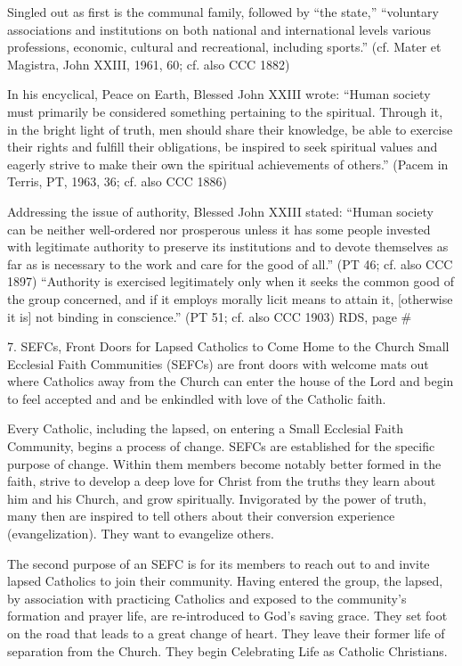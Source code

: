 \documentclass[oneside]{book}
\begin{document}
Singled out as first is the communal family, followed by ``the state,''
``voluntary associations and institutions  on both national and international
levels  various professions, economic, cultural and recreational, including
sports.'' (cf. Mater et Magistra, John XXIII, 1961, 60; cf. also CCC 1882)

In his encyclical, Peace on Earth, Blessed John XXIII wrote: ``Human society
must primarily be considered something pertaining to the spiritual. Through it,
in the bright light of truth, men should share their knowledge, be able to
exercise their rights and fulfill their obligations, be inspired to seek
spiritual values  and eagerly strive to make their own the spiritual
achievements of others.'' (Pacem in Terris, PT, 1963, 36; cf. also CCC 1886)

Addressing the issue of authority, Blessed John XXIII stated: ``Human society
can be neither well-ordered nor prosperous unless it has some people invested
with legitimate authority to preserve its institutions and to devote themselves
as far as is necessary to the work and care for the good of all.'' (PT 46;
cf. also CCC 1897) ``Authority is exercised legitimately only when it seeks the
common good of the group concerned, and if it employs morally licit means to
attain it, [otherwise it is] not binding in conscience.'' (PT 51; cf. also CCC
1903)
RDS, page \#

7. SEFCs, Front Doors for Lapsed Catholics to Come Home to the Church
Small Ecclesial Faith Communities (SEFCs) are front doors with welcome mats out
where Catholics away from the Church can enter the house of the Lord and begin
to feel accepted and and be enkindled with love of the Catholic faith.

Every Catholic, including the lapsed, on entering a Small Ecclesial Faith
Community, begins a process of change. SEFCs are established for the specific
purpose of change. Within them members become notably better formed in the
faith, strive to develop a deep love for Christ from the truths they learn about
him and his Church, and grow spiritually. Invigorated by the power of truth,
many then are inspired to tell others about their conversion experience
(evangelization). They want to evangelize others.

The second purpose of an SEFC is for its members to reach out to and invite
lapsed Catholics to join their community. Having entered the group, the lapsed,
by association with practicing Catholics and exposed to the community's
formation and prayer life, are re-introduced to God's saving grace. They set
foot on the road that leads to a great change of heart. They leave their former
life of separation from the Church. They begin Celebrating Life as Catholic
Christians.
\end{document}
